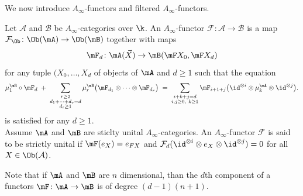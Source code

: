We now introduce $A_\infty$-functors and filtered $A_\infty$-functors.
\begin{dfn}
  Let $\mathcal{A}$ and $\mathcal{B}$ be $A_\infty$-categories over $\k$. An $A_\infty$-functor $\mathcal{F}\colon\mathcal{A}\to \mathcal{B}$ is a map $\mathcal{F}_\Ob\colon \Ob(\mA)\to \Ob(\mB)$ together with maps $$\mF_d\colon \mA(\vec{X})\to \mB(\mF X_0,\mF X_d)$$ for any tuple $(X_0,\ldots, X_d$ of objects of $\mA$ and $d\geq 1$ such that the equation 
\[
\mu_1^\mB\circ \mF_d
\;+\;
\sum_{\substack{r\ge 2\\ d_1+\cdots+d_r=d\\ d_\ell\ge 1}}
\mu_r^\mB\bigl(\mF_{d_1}\otimes \cdots \otimes \mF_{d_r}\bigr)
\;=\;
\sum_{\substack{i+k+j=d\\ i,j\ge 0,\ k\ge 1}}
\mF_{i+1+j}\bigl(\id^{\otimes i}\otimes \mu_k^\mA\otimes \id^{\otimes j}\bigr).
\]
is satisfied for any $d\geq 1$.\\ Assume $\mA$ and $\mB$ are sticlty unital $A_\infty$-categories. An $A_\infty$-functor $\mathcal{F}$ is said to be strictly unital if $\mF(e_X)=e_{FX}$  and $\mathcal{F}_d(\id^{\otimes i}\otimes e_X\otimes \id^{\otimes j}) =0$ for all $X\in \Ob(\mathcal{A})$.\\

\end{dfn}
Note that if $\mA$ and $\mB$ are $n$ dimensional, than the $d$th component of a functors $\mF\colon \mA\to \mB$ is of degree $(d-1)(n+1)$.\\

